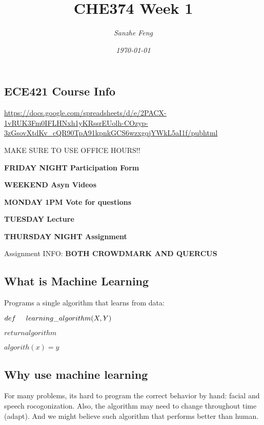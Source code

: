 \documentclass{article}
\newcommand{\cmark}{\ding{51}}
\newcommand{\done}{\rlap{$\square$}{\raisebox{2pt}{\large\hspace{1pt}\cmark}}
\hspace{-2.5pt}}
\begin{document}
\begin{titlepage}

\title{\textbf{CHE374 Week 1}}
\author{\textit{Sanzhe Feng}}
\date{\textit{\today}}
\maketitle
\end{titlepage}
\setlength{\parindent}{0pt}

\subsection*{ECE421 Course Info}
\url{https://docs.google.com/spreadsheets/d/e/2PACX-1vRUK3Fm0IFLHNxh1yKRssrEUolh-COzyp-3zGsovXtdKv_cQR90TpA91kpnkGCS6wzxgqjYWkL5aI1f/pubhtml}

MAKE SURE TO USE OFFICE HOURS!!

\begin{todolist} %
    \item \textbf{FRIDAY NIGHT Participation Form}
    \item \textbf{WEEKEND Asyn Videos}
    \item \textbf{MONDAY 1PM Vote for questions}
    \item \textbf{TUESDAY Lecture}
    \item \textbf{THURSDAY NIGHT Assignment}   
\end{todolist}

Assignment INFO: \textbf{BOTH CROWDMARK AND QUERCUS}


\subsection*{What is Machine Learning}
Programs a single algorithm that learns from data:

$def \hspace{0.5cm}learning\_algorithm (X, Y)$ 

\hspace{1.1cm}$return algorithm $

\hspace{1.1cm}$algorith(x) = y$



\subsection*{Why use machine learning}
For many problems, its hard to program the correct behavior by hand: facial and speech rocogonization.
Also, the algorithm may need to change throughout time (adapt). And we might believe such algorithm that performs better than human.
\end{document}
